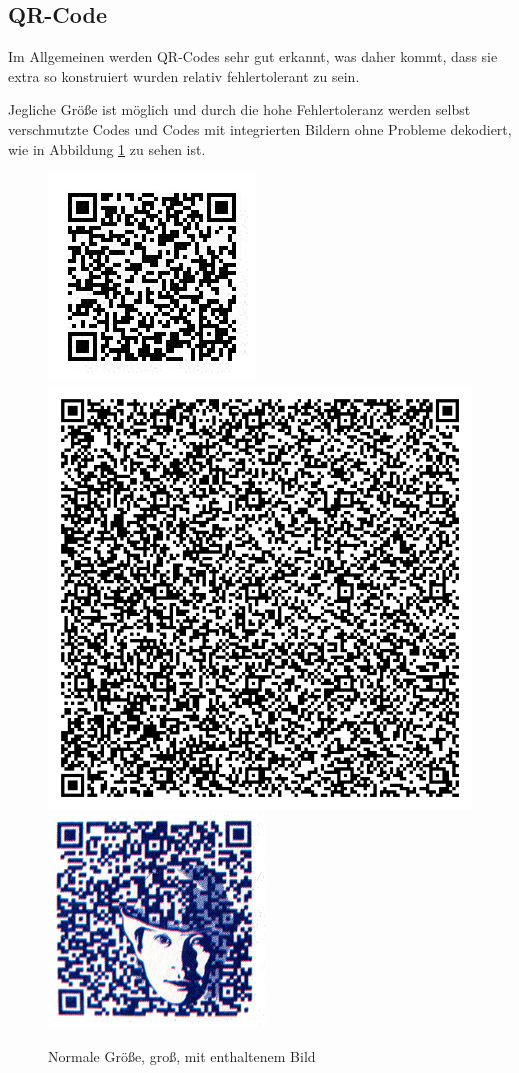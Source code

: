 \subsection*{QR-Code}
\writtenby{\dcauthornameriren}%
Im Allgemeinen werden QR-Codes sehr gut erkannt, was daher kommt, dass sie extra so konstruiert wurden relativ fehlertolerant zu sein.

Jegliche Größe ist möglich und durch die hohe Fehlertoleranz werden selbst verschmutzte Codes und Codes mit integrierten Bildern ohne Probleme dekodiert, wie in Abbildung \ref*{fig:qrnormal} zu sehen ist.

\begin{figure}[H]
  \centering
  \includegraphics[height=0.3\textwidth]{img/QR/perfect_03.jpg}
  \includegraphics[height=0.3\textwidth]{img/QR/perfect_02.png}
  \includegraphics[height=0.3\textwidth]{img/QR/perfect_04.jpg}
  \caption{Normale Größe, groß, mit enthaltenem Bild}
  \label{fig:qrnormal}
\end{figure}

